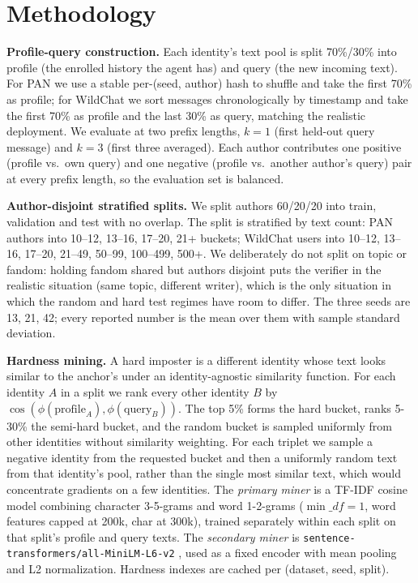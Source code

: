 \documentclass[11pt]{article}
\begin{document}
\section{Methodology}
\label{sec:method}


\noindent\textbf{Profile-query construction.} Each identity's text pool is split 70\%/30\% into profile (the enrolled history the agent has) and query (the new incoming text). For PAN we use a stable per-(seed, author) hash to shuffle and take the first 70\% as profile; for WildChat we sort messages chronologically by timestamp and take the first 70\% as profile and the last 30\% as query, matching the realistic deployment. We evaluate at two prefix lengths, $k{=}1$ (first held-out query message) and $k{=}3$ (first three averaged). Each author contributes one positive (profile vs.\ own query) and one negative (profile vs.\ another author's query) pair at every prefix length, so the evaluation set is balanced.

\noindent\textbf{Author-disjoint stratified splits.} We split authors 60/20/20 into train, validation and test with no overlap. The split is stratified by text count: PAN authors into 10--12, 13--16, 17--20, 21+ buckets; WildChat users into 10--12, 13--16, 17--20, 21--49, 50--99, 100--499, 500+. We deliberately do not split on topic or fandom: holding fandom shared but authors disjoint puts the verifier in the realistic situation (same topic, different writer), which is the only situation in which the random and hard test regimes have room to differ. The three seeds are 13, 21, 42; every reported number is the mean over them with sample standard deviation.

\noindent\textbf{Hardness mining.} A hard imposter is a different identity whose text looks similar to the anchor's under an identity-agnostic similarity function. For each identity $A$ in a split we rank every other identity $B$ by $\cos(\phi(\text{profile}_A), \phi(\text{query}_B))$. The top 5\% forms the hard bucket, ranks 5-30\% the semi-hard bucket, and the random bucket is sampled uniformly from other identities without similarity weighting. For each triplet we sample a negative identity from the requested bucket and then a uniformly random text from that identity's pool, rather than the single most similar text, which would concentrate gradients on a few identities. The \textit{primary miner} is a TF-IDF cosine model combining character 3-5-grams and word 1-2-grams ($\min\_df{=}1$, word features capped at 200k, char at 300k), trained separately within each split on that split's profile and query texts. The \textit{secondary miner} is \texttt{sentence-transformers/all-MiniLM-L6-v2} \citep{reimers2019sentencebert}, used as a fixed encoder with mean pooling and L2 normalization. Hardness indexes are cached per (dataset, seed, split).
\end{document}
